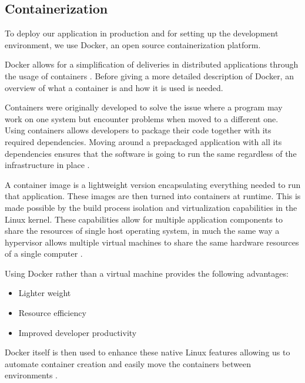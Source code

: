 \subsection{Containerization}
To deploy our application in production and for setting up the development environment, we use Docker, an open source containerization platform.

Docker allows for a simplification of deliveries in distributed applications through the usage of containers \cite{Container_Docker}. 
Before giving a more detailed description of Docker, an overview of what a container is and how it is used is needed. 


Containers were originally developed to solve the issue where a program may work on one system but encounter problems when moved to a different one. 
Using containers allows developers to package their code together with its required dependencies. 
Moving around a prepackaged application with all its dependencies ensures that the software is going to run the same regardless of the infrastructure in place \cite{Container_Docker}.


A container image is a lightweight version encapsulating everything needed to run that application. These images are then turned into containers at runtime. 
This is made possible by the build process isolation and virtualization capabilities in the Linux kernel. 
These capabilities allow for multiple application components to share the resources of single host operating system, 
in much the same way a hypervisor allows multiple virtual machines to share the same hardware resources of a single computer \cite{Container_Docker}.


Using Docker rather than a virtual machine provides the following advantages:

\begin{itemize}
    \item Lighter weight
    \item Resource efficiency
    \item Improved developer productivity
\end{itemize}

Docker itself is then used to enhance these native Linux features allowing us to automate container creation and easily move the containers between environments \cite{Docker_IBM}.